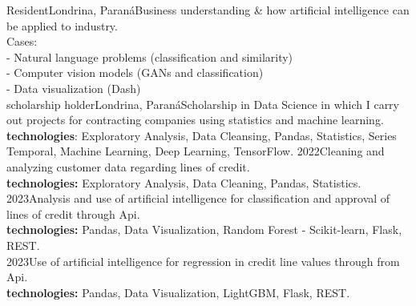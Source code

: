 \documentclass[
    10pt,
    english,
]{article}
\begin{document}
{Resident}{Londrina, Paraná}{Business understanding \& how artificial intelligence can be applied to industry. \\ Cases: \\
    \tab - Natural language problems (classification and similarity) \\
    \tab - Computer vision models (GANs and classification) \\
    \tab - Data visualization (Dash)}
\\
{scholarship holder}{Londrina, Paraná}{Scholarship in Data Science in which I carry out projects for contracting companies
    using statistics and machine learning. \\ \textbf{technologies}: Exploratory Analysis, Data Cleansing, Pandas, Statistics, Series
    Temporal, Machine Learning, Deep Learning, TensorFlow.}
{}{2022}{Cleaning and analyzing customer data regarding lines of credit. \\ \textbf{technologies:} Exploratory Analysis, Data Cleaning, Pandas, Statistics.}
\\
{}{2023}{Analysis and use of artificial intelligence for classification and approval of lines of credit through Api. \\ \textbf{technologies:} Pandas, Data Visualization, Random Forest - Scikit-learn, Flask, REST.}
\\
{}{2023}{Use of artificial intelligence for regression in credit line values ​​through from Api. \\ \textbf{technologies:} Pandas, Data Visualization, LightGBM, Flask, REST.}
\end{document}
